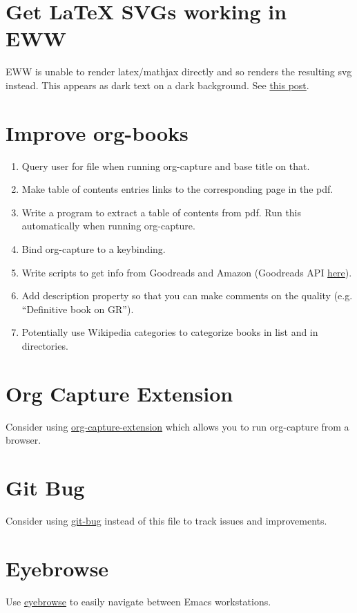 \documentclass{default}
\begin{document}
\section{Get LaTeX SVGs working in EWW}

EWW is unable to render latex/mathjax directly and so renders the resulting svg instead. This
appears as dark text on a dark background. See
\href{https://emacs.stackexchange.com/questions/3622/use-a-different-color-theme-for-eww-buffers}{this
  post}.

\section{Improve org-books}

\begin{enumerate}
\item Query user for file when running org-capture and base title on that.
\item Make table of contents entries links to the corresponding page in the pdf.
\item Write a program to extract a table of contents from pdf. Run this automatically when running
  org-capture.
\item Bind org-capture to a keybinding.
\item Write scripts to get info from Goodreads and Amazon (Goodreads API
  \href{https://www.goodreads.com/api}{here}).
\item Add description property so that you can make comments on the quality (e.g. ``Definitive book
  on GR'').
\item Potentially use Wikipedia categories to categorize books in list and in directories.
\end{enumerate}

\section{Org Capture Extension}

Consider using \href{https://github.com/sprig/org-capture-extension}{org-capture-extension} which
allows you to run org-capture from a browser.

\section{Git Bug}

Consider using \href{https://github.com/MichaelMure/git-bug}{git-bug} instead of this file to track
issues and improvements.

\section{Eyebrowse}

Use \href{https://github.com/wasamasa/eyebrowse}{eyebrowse} to easily navigate between Emacs workstations.
\end{document}

